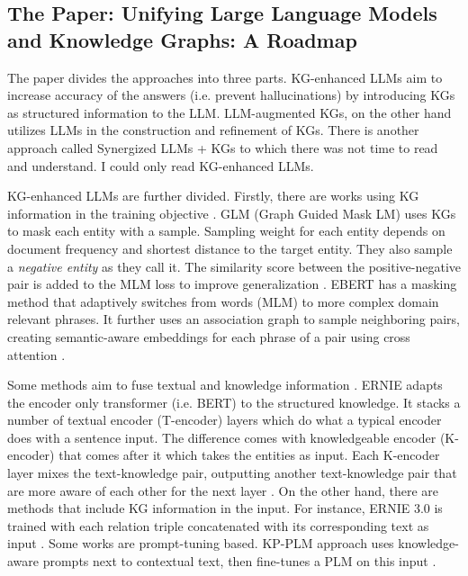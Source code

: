 \documentclass{article}
\begin{document}
\subsection{The Paper: Unifying Large Language Models and Knowledge Graphs: A Roadmap}\label{kgllm}

The paper divides the approaches into three parts. KG-enhanced LLMs aim to increase accuracy of the answers (i.e. prevent hallucinations) by introducing KGs as structured information to the LLM. LLM-augmented KGs, on the other hand utilizes LLMs in the construction and refinement of KGs. There is another approach called Synergized LLMs + KGs \cite{pan_unifying_2024} to which there was not time to read and understand. I could only read KG-enhanced LLMs.

KG-enhanced LLMs are further divided. Firstly, there are works using KG information in the training objective \cite{pan_unifying_2024}. GLM (Graph Guided Mask LM) uses KGs to mask each entity with a sample. Sampling weight for each entity depends on document frequency and shortest distance to the target entity. They also sample a \textit{negative entity} as they call it. The similarity score between the positive-negative pair is added to the MLM loss to improve generalization \cite{shen_exploiting_2020}. EBERT has a masking method that adaptively switches from words (MLM) to more complex domain relevant phrases. It further uses an association graph to sample neighboring pairs, creating semantic-aware embeddings for each phrase of a pair using cross attention \cite{zhang_e-bert_2021}. 

Some methods aim to fuse textual and knowledge information \cite{pan_unifying_2024}. ERNIE adapts the encoder only transformer (i.e. BERT) to the structured knowledge. It stacks a number of textual encoder (T-encoder) layers which do what a typical encoder does with a sentence input. The difference comes with knowledgeable encoder (K-encoder) that comes after it which takes the entities as input. Each K-encoder layer mixes the text-knowledge pair, outputting another text-knowledge pair that are more aware of each other for the next layer \cite{zhang_ernie_2019}. On the other hand, there are methods that include KG information in the input. For instance, ERNIE 3.0 is trained with each relation triple concatenated with its corresponding text as input \cite{sun_ernie_2021}. Some works are prompt-tuning based. KP-PLM approach uses knowledge-aware prompts next to contextual text, then fine-tunes a PLM on this input \cite{wang_knowledge_2022}.
\end{document}
